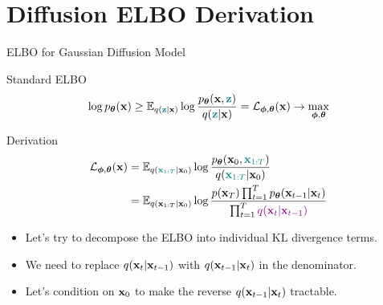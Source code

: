 \documentclass{beamer}
\renewcommand{\eqpause}{}
\renewcommand{\nextonslide}[1]{#1}
\begin{document}
\section{Diffusion ELBO Derivation}
\begin{frame}{ELBO for Gaussian Diffusion Model}
    \begin{block}{Standard ELBO}
        \vspace{-0.3cm}
        \[
            \log p_{\boldsymbol{\theta}}(\mathbf{x}) \geq \mathbb{E}_{q({\color{teal}\mathbf{z}} | \mathbf{x})} \log \frac{p_{\boldsymbol{\theta}}(\mathbf{x}, {\color{teal}\mathbf{z}})}{q({\color{teal}\mathbf{z}} | \mathbf{x})} = \mathcal{L}_{\boldsymbol{\phi}, \boldsymbol{\theta}}(\mathbf{x}) \rightarrow \max_{\boldsymbol{\phi}, \boldsymbol{\theta}}
        \]
        \vspace{-0.5cm}
    \end{block}
    \eqpause
    \begin{block}{Derivation}
        \vspace{-0.5cm}
        \begin{align*}
            \cL_{\bphi, \btheta}(\bx) &= \bbE_{q({\color{teal}\bx_{1:T}} | \bx_0)} \log \frac{\pt(\bx_0, {\color{teal}\bx_{1:T}})}{q({\color{teal}\bx_{1:T}} | \bx_0)} \\
            \nextonslide{& = \bbE_{q(\bx_{1:T} | \bx_0)} \log \frac{p(\bx_T) \prod_{t=1}^T \pt(\bx_{t-1} | \bx_t) }{\prod_{t=1}^T {\color{violet}q(\bx_t | \bx_{t-1})}}}
        \end{align*}
        \vspace{-0.3cm}
        \eqpause
        \begin{itemize}
            \item Let's try to decompose the ELBO into individual KL divergence terms.
            \item We need to replace $q(\mathbf{x}_t | \mathbf{x}_{t - 1})$ with $q(\mathbf{x}_{t - 1} | \mathbf{x}_t)$ in the denominator.
            \item Let's condition on $\mathbf{x}_0$ to make the reverse $q(\mathbf{x}_{t - 1} | \mathbf{x}_t)$ tractable.
        \end{itemize}
    \end{block}
\end{frame}
\end{document}
